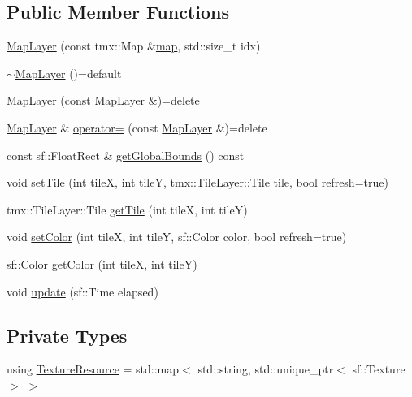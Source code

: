 \subsection*{Public Member Functions}
\begin{DoxyCompactItemize}
\item 
\hyperlink{classMapLayer_ac1b9f1e3ba6d800abf508fa11490187b}{Map\+Layer} (const tmx\+::\+Map \&\hyperlink{classmap}{map}, std\+::size\+\_\+t idx)
\item 
\hyperlink{classMapLayer_a79858f9ee05242aa47ac680940e5ea74}{$\sim$\+Map\+Layer} ()=default
\item 
\hyperlink{classMapLayer_af323ddae8da169a64be1e0c216034397}{Map\+Layer} (const \hyperlink{classMapLayer}{Map\+Layer} \&)=delete
\item 
\hyperlink{classMapLayer}{Map\+Layer} \& \hyperlink{classMapLayer_a1863f3842c104aa6d460f4d9b99ec792}{operator=} (const \hyperlink{classMapLayer}{Map\+Layer} \&)=delete
\item 
const sf\+::\+Float\+Rect \& \hyperlink{classMapLayer_ae87bc38c7c030e9b2822b53f6de13d13}{get\+Global\+Bounds} () const
\item 
void \hyperlink{classMapLayer_a1152792435a0fa6203f6c3a038b93778}{set\+Tile} (int tileX, int tileY, tmx\+::\+Tile\+Layer\+::\+Tile tile, bool refresh=true)
\item 
tmx\+::\+Tile\+Layer\+::\+Tile \hyperlink{classMapLayer_a347375abb72832ea3362ba0d29898f30}{get\+Tile} (int tileX, int tileY)
\item 
void \hyperlink{classMapLayer_a4dad5e08a823925292846664ce42657d}{set\+Color} (int tileX, int tileY, sf\+::\+Color color, bool refresh=true)
\item 
sf\+::\+Color \hyperlink{classMapLayer_a6ecfbaf968ac9e6e4f814a30aa0c0f30}{get\+Color} (int tileX, int tileY)
\item 
void \hyperlink{classMapLayer_a0f7690e23ecfde7a7dc6629f9df65635}{update} (sf\+::\+Time elapsed)
\end{DoxyCompactItemize}
\subsection*{Private Types}
\begin{DoxyCompactItemize}
\item 
using \hyperlink{classMapLayer_a64011087426e436e3cb8374570378d68}{Texture\+Resource} = std\+::map$<$ std\+::string, std\+::unique\+\_\+ptr$<$ sf\+::\+Texture $>$ $>$
\end{DoxyCompactItemize}
